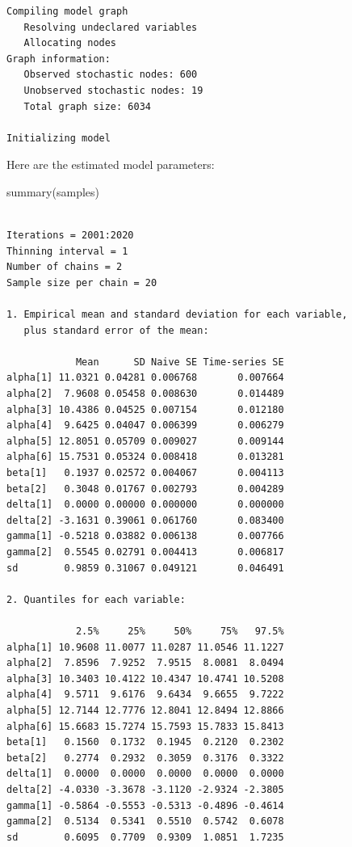 \documentclass[
  letterpaper,
  DIV=11,
  numbers=noendperiod]{scrreprt}
\newenvironment{Shaded}{\begin{snugshade}}{\end{snugshade}}
\newcommand{\FunctionTok}[1]{\textcolor[rgb]{0.28,0.35,0.67}{#1}}
\newcommand{\NormalTok}[1]{\textcolor[rgb]{0.00,0.23,0.31}{#1}}
\begin{document}
\begin{verbatim}
Compiling model graph
   Resolving undeclared variables
   Allocating nodes
Graph information:
   Observed stochastic nodes: 600
   Unobserved stochastic nodes: 19
   Total graph size: 6034

Initializing model
\end{verbatim}

Here are the estimated model parameters:

\begin{Shaded}
\begin{Highlighting}[]
\FunctionTok{summary}\NormalTok{(samples)}
\end{Highlighting}
\end{Shaded}

\begin{verbatim}

Iterations = 2001:2020
Thinning interval = 1 
Number of chains = 2 
Sample size per chain = 20 

1. Empirical mean and standard deviation for each variable,
   plus standard error of the mean:

            Mean      SD Naive SE Time-series SE
alpha[1] 11.0321 0.04281 0.006768       0.007664
alpha[2]  7.9608 0.05458 0.008630       0.014489
alpha[3] 10.4386 0.04525 0.007154       0.012180
alpha[4]  9.6425 0.04047 0.006399       0.006279
alpha[5] 12.8051 0.05709 0.009027       0.009144
alpha[6] 15.7531 0.05324 0.008418       0.013281
beta[1]   0.1937 0.02572 0.004067       0.004113
beta[2]   0.3048 0.01767 0.002793       0.004289
delta[1]  0.0000 0.00000 0.000000       0.000000
delta[2] -3.1631 0.39061 0.061760       0.083400
gamma[1] -0.5218 0.03882 0.006138       0.007766
gamma[2]  0.5545 0.02791 0.004413       0.006817
sd        0.9859 0.31067 0.049121       0.046491

2. Quantiles for each variable:

            2.5%     25%     50%     75%   97.5%
alpha[1] 10.9608 11.0077 11.0287 11.0546 11.1227
alpha[2]  7.8596  7.9252  7.9515  8.0081  8.0494
alpha[3] 10.3403 10.4122 10.4347 10.4741 10.5208
alpha[4]  9.5711  9.6176  9.6434  9.6655  9.7222
alpha[5] 12.7144 12.7776 12.8041 12.8494 12.8866
alpha[6] 15.6683 15.7274 15.7593 15.7833 15.8413
beta[1]   0.1560  0.1732  0.1945  0.2120  0.2302
beta[2]   0.2774  0.2932  0.3059  0.3176  0.3322
delta[1]  0.0000  0.0000  0.0000  0.0000  0.0000
delta[2] -4.0330 -3.3678 -3.1120 -2.9324 -2.3805
gamma[1] -0.5864 -0.5553 -0.5313 -0.4896 -0.4614
gamma[2]  0.5134  0.5341  0.5510  0.5742  0.6078
sd        0.6095  0.7709  0.9309  1.0851  1.7235
\end{verbatim}
\end{document}
